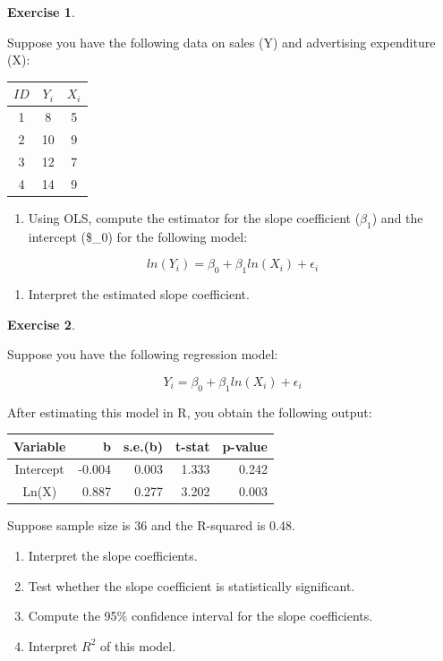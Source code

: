 \documentclass[
]{book}
\providecommand{\tightlist}{%
  \setlength{\itemsep}{0pt}\setlength{\parskip}{0pt}}
\theoremstyle{definition}
\theoremstyle{definition}
\theoremstyle{definition}
\newtheorem{exercise}{Exercise}[chapter]
\theoremstyle{definition}
\theoremstyle{remark}
\begin{document}
\begin{exercise}
\protect\hypertarget{exr:unnamed-chunk-74}{}\label{exr:unnamed-chunk-74}

Suppose you have the following data on sales (Y) and advertising expenditure (X):

\begin{longtable}[]{@{}ccc@{}}
\toprule()
\(ID\) & \(Y_i\) & \(X_i\) \\
\midrule()
\endhead
1 & 8 & 5 \\
2 & 10 & 9 \\
3 & 12 & 7 \\
4 & 14 & 9 \\
\bottomrule()
\end{longtable}

\begin{enumerate}
\def\labelenumi{\alph{enumi}.}
\tightlist
\item
  Using OLS, compute the estimator for the slope coefficient (\(\beta_1\)) and the intercept (\$\beta\_0) for the following model:
\end{enumerate}

\[ln(Y_i) = \beta_0 + \beta_1 ln(X_i) + \epsilon_i\]

\begin{enumerate}
\def\labelenumi{\alph{enumi}.}
\setcounter{enumi}{1}
\tightlist
\item
  Interpret the estimated slope coefficient.
\end{enumerate}

\end{exercise}

\begin{exercise}
\protect\hypertarget{exr:unnamed-chunk-75}{}\label{exr:unnamed-chunk-75}

Suppose you have the following regression model:

\[Y_i=\beta_0 + \beta_1 ln(X_i) +\epsilon_i\]

After estimating this model in R, you obtain the following output:

\begin{longtable}[]{@{}crrrr@{}}
\toprule()
Variable & b & s.e.(b) & t-stat & p-value \\
\midrule()
\endhead
Intercept & -0.004 & 0.003 & 1.333 & 0.242 \\
Ln(X) & 0.887 & 0.277 & 3.202 & 0.003 \\
\bottomrule()
\end{longtable}

Suppose sample size is 36 and the R-squared is 0.48.

\begin{enumerate}
\def\labelenumi{\alph{enumi}.}
\item
  Interpret the slope coefficients.
\item
  Test whether the slope coefficient is statistically significant.
\item
  Compute the 95\% confidence interval for the slope coefficients.
\item
  Interpret \(R^2\) of this model.
\end{enumerate}

\end{exercise}
\end{document}
